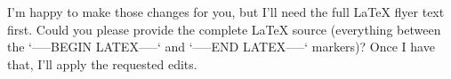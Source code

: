 I’m happy to make those changes for you, but I’ll need the full LaTeX flyer text first. Could you please provide the complete LaTeX source (everything between the `-----BEGIN LATEX-----` and `-----END LATEX-----` markers)? Once I have that, I’ll apply the requested edits.